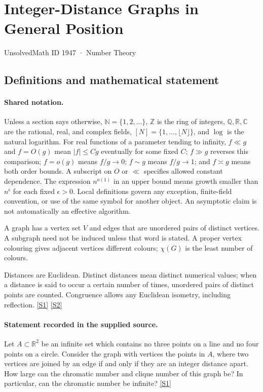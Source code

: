 \documentclass[11pt,a4paper]{article}
\newcommand{\N}{\mathbb{N}}
\newcommand{\Z}{\mathbb{Z}}
\newcommand{\Q}{\mathbb{Q}}
\newcommand{\R}{\mathbb{R}}
\newcommand{\C}{\mathbb{C}}
\newcommand{\sref}[2]{\hyperlink{source:#1:#2}{[S#2]}}
\begin{document}

\setcounter{section}{1946}

\section{Integer-Distance Graphs in General Position}\label{1947}

{\small\sffamily UnsolvedMath ID 1947 · Number Theory}

\subsection{Definitions and mathematical statement}

\paragraph{Shared notation.}Unless a section says otherwise, $\N=\{1,2,\ldots\}$,
$\Z$ is the ring of integers, $\Q,\R,\C$ are the rational, real, and complex
fields, $[N]=\{1,\ldots,\lfloor N\rfloor\}$, and $\log$ is the natural
logarithm. For real functions of a parameter tending to infinity,
$f\ll g$ and $f=O(g)$ mean $|f|\leq Cg$ eventually for some fixed $C$;
$f\gg g$ reverses this comparison; $f=o(g)$ means $f/g\to0$;
$f\sim g$ means $f/g\to1$; and $f\asymp g$ means both order bounds.
A subscript on $O$ or $\ll$ specifies allowed constant dependence.
The expression $n^{o(1)}$ in an upper bound means growth smaller than
$n^\epsilon$ for each fixed $\epsilon>0$. Local definitions govern any
exception, finite-field convention, or use of the same symbol for another
object. An asymptotic claim is not automatically an effective algorithm.



A graph has a vertex set $V$ and edges that are unordered pairs of distinct vertices. A subgraph need not be induced unless that word is stated. A proper vertex colouring gives adjacent vertices different colours; $\chi(G)$ is the least number of colours.

Distances are Euclidean. Distinct distances mean distinct numerical values; when a distance is said to occur a certain number of times, unordered pairs of distinct points are counted. Congruence allows any Euclidean isometry, including reflection. \sref{1947}{1} \sref{1947}{2}

\paragraph{Statement recorded in the supplied source.}
Let $A\subset\mathbb{R}^2$ be an infinite set which contains no three points on a line and no four points on a circle. Consider the graph with vertices the points in $A$, where two vertices are joined by an edge if and only if they are an integer distance apart.
How large can the chromatic number and clique number of this graph be? In particular, can the chromatic number be infinite? \sref{1947}{1}
\end{document}
